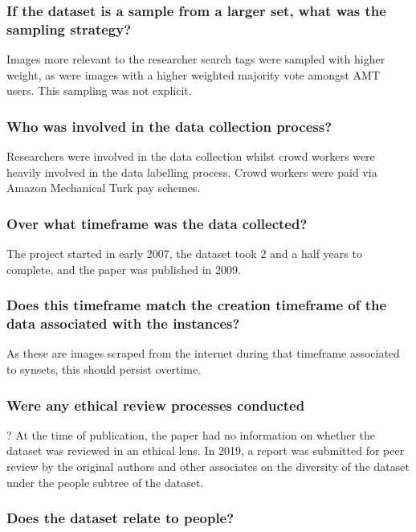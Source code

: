 \documentclass[a4paper,12pt]{article}
\begin{document}
\subsubsection*{If the dataset is a sample from a larger set, what was the sampling strategy?}

Images more relevant to the researcher search tags were sampled with higher weight, as were
images with a higher weighted majority vote amongst AMT users. This sampling was not explicit.


\subsubsection*{Who was involved in the data collection process?}
Researchers were involved in the data collection whilst crowd workers were heavily involved in the
data labelling process. Crowd workers were paid via Amazon Mechanical Turk pay schemes.

\subsubsection*{Over what timeframe was the data collected?}

The project started in early 2007, the dataset took 2 and a half years to complete, and the paper was
published in 2009.

\subsubsection*{Does this timeframe match the creation timeframe of the data associated with the instances?}
As these are images scraped from the internet during that timeframe associated to synsets, this
should persist overtime.

\subsubsection*{Were any ethical review processes conducted}?
At the time of publication, the paper had no information on whether the dataset was reviewed in an
ethical lens. In 2019, a report was submitted for peer review by the original authors and other
associates on the diversity of the dataset under the people subtree of the dataset.

\subsubsection*{Does the dataset relate to people?}
\end{document}
